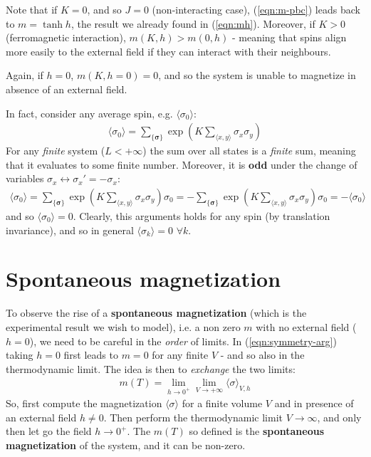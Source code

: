 \documentclass[../template.tex]{subfiles}
\begin{document}
\medskip

Note that if $K = 0$, and so $J=0$ (non-interacting case), (\ref{eqn:m-pbc}) leads back to $m = \tanh h$, the result we already found in (\ref{eqn:mh}). Moreover, if $K > 0$ (ferromagnetic interaction), $m(K,h) > m(0,h)$ - meaning that spins align more easily to the external field if they can interact with their neighbours.

\medskip

Again, if $h=0$, $m(K,h=0) = 0$, and so the system is unable to magnetize in absence of an external field.

In fact, consider any average spin, e.g. $\langle \sigma_0 \rangle$:
\begin{align*}
    \langle \sigma_0 \rangle = \sum_{\{\bm{\sigma}\}} \exp\left(K \sum_{\langle x,y \rangle} \sigma_x \sigma_y\right)
\end{align*}
For any \textit{finite} system ($L < +\infty$) the sum over all states is a \textit{finite} sum, meaning that it evaluates to some finite number. Moreover, it is \textbf{odd} under the change of variables $\sigma_x \leftrightarrow \sigma_x' = -\sigma_x$:
\begin{align}\label{eqn:symmetry-arg}
    \langle \sigma_0 \rangle = \sum_{\{\bm{\sigma}\}} \exp\left(K \sum_{\langle x,y \rangle} \sigma_x \sigma_y\right)  \sigma_0 = -\sum_{\{\bm{\sigma}\}} \exp\left(K \sum_{\langle x,y \rangle} \sigma_x \sigma_y \right) \sigma_0 = -\langle \sigma_0 \rangle
\end{align} 
and so $\langle \sigma_0 \rangle = 0$. Clearly, this arguments holds for any spin (by translation invariance), and so in general $\langle \sigma_k \rangle = 0$ $\forall k$.

\section{Spontaneous magnetization}
To observe the rise of a \textbf{spontaneous magnetization} (which is the experimental result we wish to model), i.e. a non zero $m$ with no external field ($h=0$), we need to be careful in the \textit{order} of limits. In (\ref{eqn:symmetry-arg}) taking $h = 0$ first leads to $m = 0$ for any finite $V$ - and so also in the thermodynamic limit. The idea is then to \textit{exchange} the two limits:
\begin{align}\label{eqn:break1}
    m(T) = \lim_{h \to 0^+} \lim_{V \to+ \infty} \langle \sigma \rangle_{V,h}
\end{align}
So, first compute the magnetization $\langle \sigma \rangle$ for a finite volume $V$ and in presence of an external field $h \neq 0$. Then perform the thermodynamic limit $V \to \infty$, and only then let go the field $h \to 0^+$. The $m(T)$ so defined is the \textbf{spontaneous magnetization} of the system, and it can be non-zero.
\end{document}
